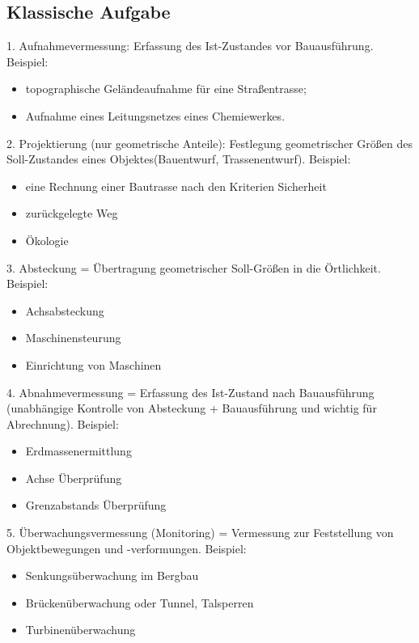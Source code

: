 \documentclass[12pt]{article}
\begin{document}
\subsection{Klassische Aufgabe}
1. Aufnahmevermessung: Erfassung des Ist-Zustandes vor Bauausführung.
\newline
Beispiel: 
\begin{itemize}
\item topographische Geländeaufnahme für eine Straßentrasse;
\item Aufnahme eines Leitungsnetzes eines Chemiewerkes.
\end{itemize}
2. Projektierung (nur geometrische Anteile): Festlegung geometrischer Größen des Soll-Zustandes eines Objektes(Bauentwurf, Trassenentwurf).
\newline
Beispiel: 
\begin{itemize}
\item eine Rechnung einer Bautrasse nach den Kriterien Sicherheit
\item zurückgelegte Weg
\item Ökologie
\end{itemize}
3. Absteckung = Übertragung geometrischer Soll-Größen in die Örtlichkeit.
\newline
Beispiel: 
\begin{itemize}
\item Achsabsteckung
\item Maschinensteurung
\item Einrichtung von Maschinen
\end{itemize}
4. Abnahmevermessung = Erfassung des Ist-Zustand nach Bauausführung (unabhängige Kontrolle von Absteckung + Bauausführung und wichtig für Abrechnung).
\newline
Beispiel:
\begin{itemize}
\item Erdmassenermittlung
\item Achse Überprüfung
\item Grenzabstands Überprüfung
\end{itemize}
5. Überwachungsvermessung (Monitoring) = Vermessung zur Feststellung von Objektbewegungen und -verformungen.
\newline
Beispiel:
\begin{itemize}
\item Senkungsüberwachung im Bergbau
\item Brückenüberwachung oder Tunnel, Talsperren
\item Turbinenüberwachung
\end{itemize}
\newpage
\end{document}
